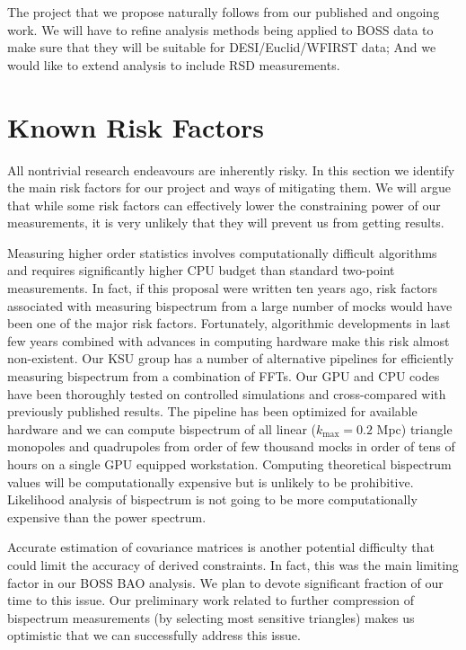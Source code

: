 The project that we propose naturally follows from our published and ongoing
work. We will have to refine analysis methods being applied to BOSS data to
make sure that they will be suitable for DESI/Euclid/WFIRST data; And we would
like to extend analysis to include RSD measurements.


\section{Known Risk Factors}

All nontrivial research endeavours are inherently risky. In this section we
identify the main risk factors for our project and ways of mitigating them. We
will argue that while some risk factors can effectively lower the constraining
power of our measurements, it is very unlikely that they will prevent us from
getting results.

Measuring higher order statistics involves computationally difficult algorithms
and requires significantly higher CPU budget than standard two-point
measurements.  In fact, if this proposal were written ten years ago, risk
factors associated with measuring bispectrum from a large number of mocks would
have been one of the major risk factors. Fortunately, algorithmic developments
in last few years combined with advances in computing hardware make this risk
almost non-existent. Our KSU group has a number of alternative pipelines for
efficiently measuring bispectrum from a combination of FFTs. Our GPU and CPU
codes have been thoroughly tested on controlled simulations and cross-compared
with previously published results. The pipeline has been optimized for
available hardware and we can compute bispectrum of all linear ($k_\mathrm{max}
= 0.2$ Mpc) triangle monopoles and quadrupoles from order of few thousand mocks
in order of tens of hours on a single GPU equipped workstation. Computing
theoretical bispectrum values will be computationally expensive but is unlikely
to be prohibitive. Likelihood analysis of bispectrum is not going to be more
computationally expensive than the power spectrum.

Accurate estimation of covariance matrices is another potential difficulty that
could limit the accuracy of derived constraints. In fact, this was the main
limiting factor in our BOSS BAO analysis. We plan to devote significant
fraction of our time to this issue. Our preliminary work related to further
compression of bispectrum measurements (by selecting most sensitive triangles)
makes us optimistic that we can successfully address this issue.

